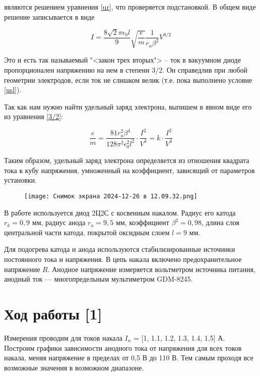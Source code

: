 \documentclass[a4paper,12pt]{article}
\theoremstyle{definition}
\begin{document}
являются решением уравнения \eqref{ur}, что проверяется подстановкой. В общем виде решение записывается в виде

\begin{equation}\label{3/2}
I = \dfrac{8\sqrt{2}\pi \epsilon_0 l}{9}\sqrt{\dfrac{e}{m}}\dfrac{1}{r_a\beta^2} V^{3/2}
\end{equation}

Это и есть так называемый "<закон трех вторых"> -- ток в вакуумном диоде пропорционален напряжению на нем в степени 3/2. Он справедлив при любой геометрии электродов, если ток не слишком велик (т.е. пока выполнено условие \eqref{usl}). 

Так как нам нужно найти удельный заряд электрона, выпишем в явном виде его из уравнения \eqref{3/2}:

\begin{equation}\label{e/m}
\dfrac{e}{m} = \dfrac{81r_a^2\beta^4}{128\pi^2\epsilon_0^2l^2} \cdot \dfrac{I^2}{V^3} = k \cdot \dfrac{I^2}{V^3}
\end{equation}

Таким образом, удельный заряд электрона определяется из отношения квадрата тока к кубу напряжения, умноженный на коэффициент, зависящий от параметров установки.

\begin{figure}[h!]
    \centering
    \texttt{[image: Снимок экрана 2024-12-26 в 12.09.32.png]}
   
\end{figure}

В работе используется диод 2Ц2С с косвенным накалом. Радиус его катода $ r_k = 0,9 $ мм, радиус анода $ r_a = 9,5  $ мм, коэффициент $ \beta^2 = 0,98 $, длина слоя центральной части катода, покрытой оксидным слоем $ l = 9 $ мм.

Для подогрева катода и анода используются стабилизированные источники постоянного тока и напряжения. В цепь накала включено предохранительное напряжение $ R $. Анодное напряжение измеряется вольтметром источника питания, анодный ток --- многопредельным мультиметром GDM-8245. 


\section{Ход работы [1]}

Измерения проводим для токов накала  $I_n$  = [1, 1.1, 1.2, 1.3, 1.4, 1.5]  $А$.
\\

Построим графики зависимости анодного тока от напряжения для всех токов накала, меняя напряжение в пределах от 0,5 В до 110 В. Тем самым проходя все возможные значения в возможном диапазоне.
\end{document}

